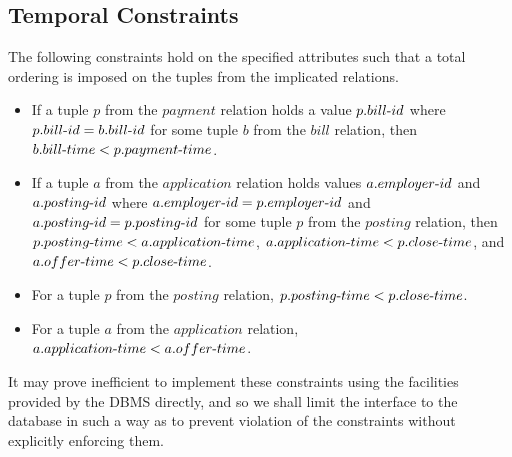 \documentclass{article}
\newcommand{\tdash}{\textnormal{-}}
\begin{document}
        \subsection{Temporal Constraints} 
            The following constraints hold on the specified attributes such that a total ordering is imposed on the
            tuples from the implicated relations.
            \begin{itemize}
                \item If a tuple $p$ from the $payment$ relation holds a value $p.bill \tdash id$ where $p.bill \tdash
                    id = b.bill \tdash id$ for some tuple $b$ from the $bill$ relation, then $b.bill \tdash time <
                    p.payment \tdash time$.
                \item If a tuple $a$ from the $application$ relation holds values $a.employer \tdash id$ and $a.posting
                    \tdash id$ where $a.employer \tdash id = p.employer \tdash id$ and $a.posting \tdash id = p.posting
                    \tdash id$ for some tuple $p$ from the $posting$ relation, then $p.posting \tdash time <
                    a.application \tdash time$, $a.application \tdash time < p.close \tdash time$, and $a.offer \tdash
                    time < p.close \tdash time$.
                \item For a tuple $p$ from the $posting$ relation, $p.posting \tdash time < p.close \tdash time$.
                \item For a tuple $a$ from the $application$ relation, $a.application \tdash time < a.offer \tdash time$.
            \end{itemize}
            It may prove inefficient to implement these constraints using the facilities provided by the DBMS directly,
            and so we shall limit the interface to the database in such a way as to prevent violation of the
            constraints without explicitly enforcing them.
\end{document}
